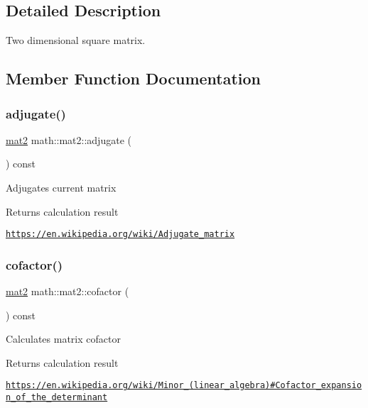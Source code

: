 \subsection{Detailed Description}
Two dimensional square matrix. 

\subsection{Member Function Documentation}
\mbox{\label{structmath_1_1mat2_a3690044fe3bbd155a1298a6b3f047705}} 
\subsubsection{\texorpdfstring{adjugate()}{adjugate()}}
{\footnotesize\ttfamily \hyperlink{structmath_1_1mat2}{mat2} math\+::mat2\+::adjugate (\begin{DoxyParamCaption}{ }\end{DoxyParamCaption}) const\hspace{0.3cm}{\ttfamily [inline]}}

Adjugates current matrix \begin{DoxyReturn}{Returns}
calculation result
\end{DoxyReturn}
\href{https://en.wikipedia.org/wiki/Adjugate_matrix}{\tt https\+://en.\+wikipedia.\+org/wiki/\+Adjugate\+\_\+matrix} \mbox{\label{structmath_1_1mat2_ac3be1c005e806fc3a517c09c37be44ba}} 
\subsubsection{\texorpdfstring{cofactor()}{cofactor()}}
{\footnotesize\ttfamily \hyperlink{structmath_1_1mat2}{mat2} math\+::mat2\+::cofactor (\begin{DoxyParamCaption}{ }\end{DoxyParamCaption}) const\hspace{0.3cm}{\ttfamily [inline]}}

Calculates matrix cofactor \begin{DoxyReturn}{Returns}
calculation result
\end{DoxyReturn}
\href{https://en.wikipedia.org/wiki/Minor_(linear_algebra)#Cofactor_expansion_of_the_determinant}{\tt https\+://en.\+wikipedia.\+org/wiki/\+Minor\+\_\+(linear\+\_\+algebra)\#\+Cofactor\+\_\+expansion\+\_\+of\+\_\+the\+\_\+determinant} \mbox{\label{structmath_1_1mat2_ac4f7c1b4967c8f9c9857eb346ff8c0e3}} 
